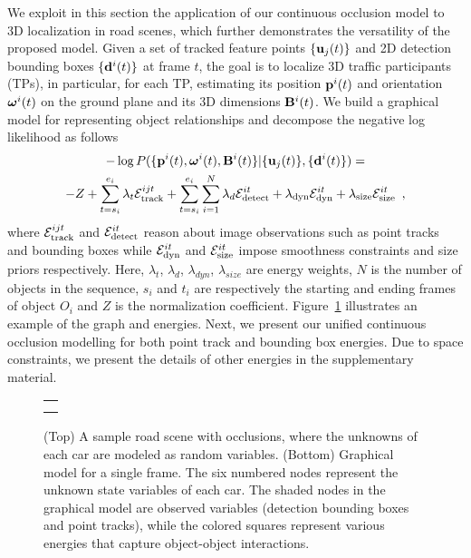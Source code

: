 We exploit in this section the application of our continuous occlusion model to 3D localization in road scenes, which further demonstrates the versatility of the proposed model. Given a set of tracked feature points $\{\mathbf{u}_j(t)\}$ and 2D detection bounding boxes $\{\mathbf{d}^{i}(t)\}$ at frame $t$, the goal is to localize 3D traffic participants (TPs), in particular, for each TP, estimating its position $\mathbf{p}^i(t)$ and orientation $\bm{\omega}^i(t)$ on the ground plane and its 3D dimensions $\mathbf{B}^i(t)$. We build a graphical model for representing object relationships and decompose the negative log likelihood as follows
%
\begin{multline*}
  -\log{P(\{ \mathbf{p}^i(t) , \bm{\omega}^i(t) , \mathbf{B}^i(t) \} | \{\mathbf{u}_j(t)\} , \{\mathbf{d}^{i}(t)\} )} = \\
  -Z 
   + \sum_{t=s_i}^{e_i} \lambda_t\mathcal{E}^{ijt}_{\text{track}}
  + 
  \sum_{t=s_i}^{e_i}
  \sum_{i=1}^N  
  \lambda_d\mathcal{E}^{it}_{\text{detect}}
  + \lambda_{\text{dyn}}\mathcal{E}^{it}_{\text{dyn}}
  + \lambda_{\text{size}}\mathcal{E}^{it}_{\text{size}}
  \enspace,
\end{multline*}
%
where $\mathcal{E}^{ijt}_{\text{track}}$ and $\mathcal{E}^{it}_{\text{detect}}$ reason about image observations such as point tracks and bounding boxes while $\mathcal{E}^{it}_{\text{dyn}}$  and $\mathcal{E}^{it}_{\text{size}}$ impose smoothness constraints and size priors respectively. Here, $\lambda_{t}$, $\lambda_{d}$, $\lambda_{dyn}$, $\lambda_{size}$ are energy weights, $N$ is the number of objects in the sequence, $s_i$ and $t_i$ are respectively the starting and ending frames of object $O_i$ and $Z$ is the normalization coefficient. Figure~\ref{fig:graphmodel} illustrates an example of the graph and energies. Next, we present our unified continuous occlusion modelling for both point track and bounding box energies. Due to space constraints, we present the details of other energies in the supplementary material.

\begin{figure}
  \centering
  \begin{tabular}{c}
    \newcommand{\imagewidth}{7.5cm}
      \hspace{-0.8cm}
     \\
      \hspace{-0.8cm}
    
  \end{tabular}
  \caption{\small (Top) A sample road scene with occlusions, where the unknowns of each car are modeled as random variables. (Bottom) Graphical model for a single frame. The six numbered nodes represent the unknown state variables of each car. The shaded nodes in the graphical model are observed variables (detection bounding boxes and point tracks), while the colored squares represent various energies that capture object-object interactions.}
  \label{fig:graphmodel}
\end{figure}



